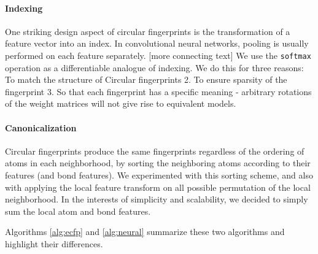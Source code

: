 \documentclass{article}
\begin{document}
\paragraph{Indexing}
One striking design aspect of circular fingerprints is the transformation of a feature vector into an index.
In convolutional neural networks, pooling is usually performed on each feature separately.
[more connecting text]
We use the \texttt{softmax} operation as a differentiable analogue of indexing.
We do this for three reasons: To match the structure of Circular fingerprints 2. To ensure sparsity of the fingerprint 3. So that each fingerprint has a specific meaning - arbitrary rotations of the weight matrices will not give rise to equivalent models.

\paragraph{Canonicalization}
Circular fingerprints produce the same fingerprints regardless of the ordering of atoms in each neighborhood, by sorting the neighboring atoms according to their features (and bond features).
We experimented with this sorting scheme, and also with applying the local feature transform on all possible permutation of the local neighborhood.
In the interests of simplicity and scalability, we decided to simply sum the local atom and bond features.

Algorithms \ref{alg:ecfp} and \ref{alg:neural} summarize these two algorithms and highlight their differences.
\end{document}
